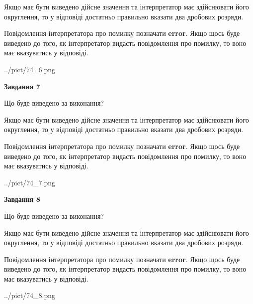 \documentclass[12pt, ukrainian]{article}
\begin{document}
{\begin {Large}
Якщо має бути виведено дійсне значення та інтерпретатор має здійснювати його округлення, 
то у відповіді достатньо правильно вказати два дробових розряди.

Повідомлення інтерпретатора про помилку позначати \textbf{error}.
Якщо щось буде виведено до того, як інтерпретатор видасть повідомлення про помилку, 
то воно має вказуватись у відповіді. \par

\begin{center}
	{../pict/74_6.png}
\end{center}
\newpage

{\begin {center}\textbf{Завдання 7}\end {center}}\par
Що буде виведено за виконання? \par

Якщо має бути виведено дійсне значення та інтерпретатор має здійснювати його округлення, 
то у відповіді достатньо правильно вказати два дробових розряди.

Повідомлення інтерпретатора про помилку позначати \textbf{error}.
Якщо щось буде виведено до того, як інтерпретатор видасть повідомлення про помилку, 
то воно має вказуватись у відповіді. \par

\begin{center}
	{../pict/74_7.png}
\end{center}
\newpage

{\begin {center}\textbf{Завдання 8}\end {center}}\par
Що буде виведено за виконання? \par

Якщо має бути виведено дійсне значення та інтерпретатор має здійснювати його округлення, 
то у відповіді достатньо правильно вказати два дробових розряди.

Повідомлення інтерпретатора про помилку позначати \textbf{error}.
Якщо щось буде виведено до того, як інтерпретатор видасть повідомлення про помилку, 
то воно має вказуватись у відповіді. \par

\begin{center}
	{../pict/74_8.png}
\end{center}
\newpage


\end{Large}}
\end{document}

